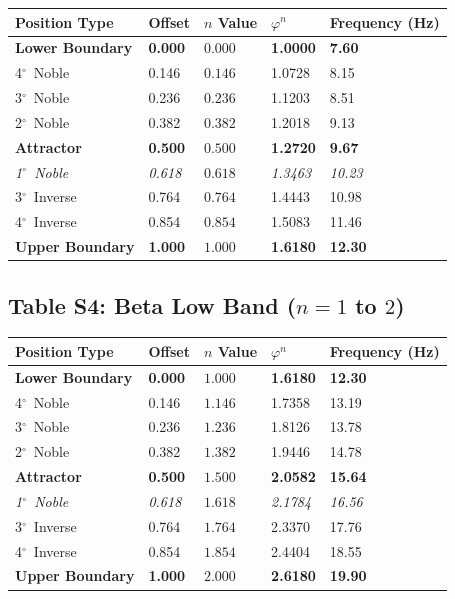 \documentclass[11pt,a4paper]{article}
\newcommand{\degree}{$^\circ$}  %
\newcommand{\phisym}{\varphi}
\begin{document}
\begin{table}[H]
\centering
\begin{tabular}{@{}lllll@{}}
\toprule
Position Type & Offset & $n$ Value & $\phisym^n$ & Frequency (Hz) \\
\midrule
\textbf{Lower Boundary} & \textbf{0.000} & $\mathbf{0.000}$ & \textbf{1.0000} & \textbf{7.60} \\
4\degree\ Noble & 0.146 & $0.146$ & 1.0728 & 8.15 \\
3\degree\ Noble & 0.236 & $0.236$ & 1.1203 & 8.51 \\
2\degree\ Noble & 0.382 & $0.382$ & 1.2018 & 9.13 \\
\textbf{Attractor} & \textbf{0.500} & $\mathbf{0.500}$ & \textbf{1.2720} & \textbf{9.67} \\
\textit{1\degree\ Noble} & \textit{0.618} & $0.618$ & \textit{1.3463} & \textit{10.23} \\
3\degree\ Inverse & 0.764 & $0.764$ & 1.4443 & 10.98 \\
4\degree\ Inverse & 0.854 & $0.854$ & 1.5083 & 11.46 \\
\textbf{Upper Boundary} & \textbf{1.000} & $\mathbf{1.000}$ & \textbf{1.6180} & \textbf{12.30} \\
\bottomrule
\end{tabular}
\end{table}

\subsection*{Table S4: Beta Low Band ($n = 1$ to $2$)}

\begin{table}[H]
\centering
\begin{tabular}{@{}lllll@{}}
\toprule
Position Type & Offset & $n$ Value & $\phisym^n$ & Frequency (Hz) \\
\midrule
\textbf{Lower Boundary} & \textbf{0.000} & $\mathbf{1.000}$ & \textbf{1.6180} & \textbf{12.30} \\
4\degree\ Noble & 0.146 & $1.146$ & 1.7358 & 13.19 \\
3\degree\ Noble & 0.236 & $1.236$ & 1.8126 & 13.78 \\
2\degree\ Noble & 0.382 & $1.382$ & 1.9446 & 14.78 \\
\textbf{Attractor} & \textbf{0.500} & $\mathbf{1.500}$ & \textbf{2.0582} & \textbf{15.64} \\
\textit{1\degree\ Noble} & \textit{0.618} & $1.618$ & \textit{2.1784} & \textit{16.56} \\
3\degree\ Inverse & 0.764 & $1.764$ & 2.3370 & 17.76 \\
4\degree\ Inverse & 0.854 & $1.854$ & 2.4404 & 18.55 \\
\textbf{Upper Boundary} & \textbf{1.000} & $\mathbf{2.000}$ & \textbf{2.6180} & \textbf{19.90} \\
\bottomrule
\end{tabular}
\end{table}
\end{document}
